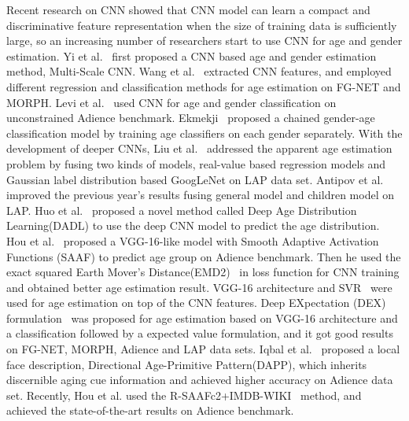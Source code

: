 \documentclass[journal]{IEEEtran}
\begin{document}
Recent research on CNN showed that CNN model can learn a compact and discriminative feature representation when the size of training data is sufficiently large, so an increasing number of researchers start to use CNN for age and gender estimation. Yi et al.~\cite{Agemulti} first proposed a CNN based age and gender estimation method, Multi-Scale CNN. Wang et al.~\cite{AgeWang} extracted CNN features, and employed different regression and classification methods for age estimation on FG-NET and MORPH. Levi et al.~\cite{Agegenderbycnn} used CNN for age and gender classification on unconstrained Adience benchmark. Ekmekji~\cite{AgeEkmekji} proposed a chained gender-age classification model by training age classifiers on each gender separately. With the development of deeper CNNs, Liu et al.~\cite{Agenet} addressed the apparent age estimation problem by fusing two kinds of models, real-value based regression models and Gaussian label distribution based GoogLeNet on LAP data set. Antipov et al.~\cite{Aae} improved the previous year's results fusing general model and children model on LAP. Huo et al.~\cite{Dad} proposed a novel method called Deep Age Distribution Learning(DADL) to use the deep CNN model to predict the age distribution. Hou et al.~\cite{AgeSAAF} proposed a VGG-16-like model with Smooth Adaptive Activation Functions (SAAF) to predict age group on Adience benchmark. Then he used the exact squared Earth Mover’s Distance(EMD2)~\cite{EMD2} in loss function for CNN training and obtained better age estimation result. VGG-16 architecture and SVR~\cite{AgeRothe} were used for age estimation on top of the CNN features. Deep EXpectation (DEX) formulation~\cite{Dex} was proposed for age estimation based on VGG-16 architecture and a classification followed by a expected value formulation, and it got good results on FG-NET, MORPH, Adience and LAP data sets. Iqbal et al.~\cite{DAPP} proposed a local face description, Directional Age-Primitive Pattern(DAPP), which inherits discernible aging cue information and achieved higher accuracy on Adience data set. Recently, Hou et al. used the R-SAAFc2+IMDB-WIKI~\cite{SAAF+IMDB} method, and achieved the state-of-the-art results on Adience benchmark.
\end{document}
